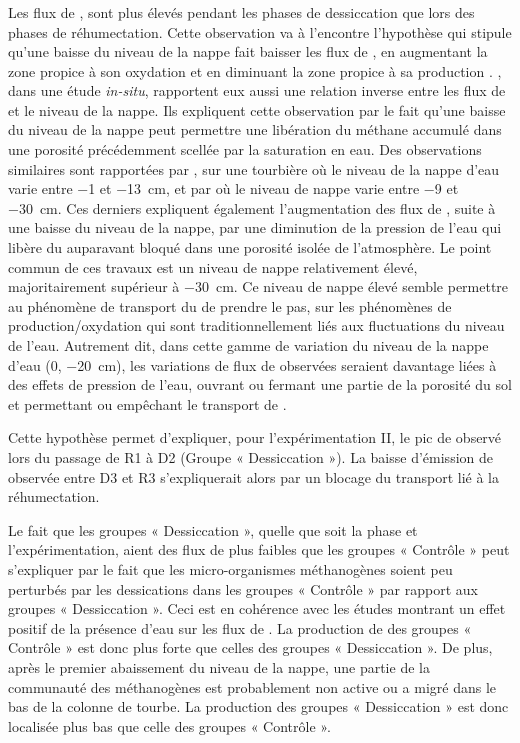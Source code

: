 \subsubsection{\chh}
Les flux de \chh, sont plus élevés pendant les phases de dessiccation que lors des phases de réhumectation.
Cette observation va à l'encontre l'hypothèse qui stipule qu'une baisse du niveau de la nappe fait baisser les flux de \chh, en augmentant la zone propice à son oxydation et en diminuant la zone propice à sa production \citep{aerts1997,pelletier2007,turetsky2008}.
\citet{kettunen1996}, dans une étude \textit{in-situ}, rapportent eux aussi une relation inverse entre les flux de \chh et le niveau de la nappe.
Ils expliquent cette observation par le fait qu'une baisse du niveau de la nappe peut permettre une libération du méthane accumulé dans une porosité précédemment scellée par la saturation en eau.
Des observations similaires sont rapportées par \citet{bellisario1999}, sur une tourbière où le niveau de la nappe d'eau varie entre \num{-1} et \SI{-13}{\centi\metre}, et par \citet{treat2007} où le niveau de nappe varie entre \num{-9} et \SI{-30}{\centi\metre}.
Ces derniers expliquent également l'augmentation des flux de \chh, suite à une baisse du niveau de la nappe, par une diminution de la pression de l'eau qui libère du \chh auparavant bloqué dans une porosité isolée de l'atmosphère.
Le point commun de ces travaux est un niveau de nappe relativement élevé, majoritairement supérieur à \SI{-30}{\centi\metre}.
Ce niveau de nappe élevé semble permettre au phénomène de transport du \chh de prendre le pas, sur les phénomènes de production/oxydation qui sont traditionnellement liés aux fluctuations du niveau de l'eau.
Autrement dit, dans cette gamme de variation du niveau de la nappe d'eau (0, \SI{-20}{\centi\metre}), les variations de flux de \chh observées seraient davantage liées à des effets de pression de l'eau, ouvrant ou fermant une partie de la porosité du sol et permettant ou empêchant le transport de \chh.

Cette hypothèse permet d'expliquer, pour l'expérimentation II, le pic de \chh observé lors du passage de R1 à D2 (Groupe « Dessiccation »).
La baisse d'émission de \chh observée entre D3 et R3 s'expliquerait alors par un blocage du transport lié à la réhumectation.

Le fait que les groupes « Dessiccation », quelle que soit la phase et l'expérimentation, aient des flux de \chh plus faibles que les groupes « Contrôle » peut s'expliquer par le fait que les micro-organismes méthanogènes soient peu perturbés par les dessications dans les groupes « Contrôle » par rapport aux groupes « Dessiccation ».
Ceci est en cohérence avec les études montrant un effet positif de la présence d'eau sur les flux de \chh.
La production de \chh des groupes « Contrôle » est donc plus forte que celles des groupes « Dessiccation ».
De plus, après le premier abaissement du niveau de la nappe, une partie de la communauté des méthanogènes est probablement non active ou a migré dans le bas de la colonne de tourbe.
La production des groupes « Dessiccation » est donc localisée plus bas que celle des groupes « Contrôle ».

